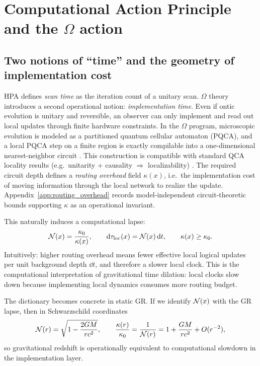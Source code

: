 \section{Computational Action Principle and the \texorpdfstring{$\Omega$}{Omega} action}
\label{sec:cap_action}

\subsection{Two notions of ``time'' and the geometry of implementation cost}
\label{subsec:two_times}

HPA defines \emph{scan time} as the iteration count of a unitary scan. $\Omega$ theory introduces a second operational notion: \emph{implementation time}. Even if ontic evolution is unitary and reversible, an observer can only implement and read out local updates through finite hardware constraints. In the $\Omega$ program, microscopic evolution is modeled as a partitioned quantum cellular automaton (PQCA), and a local PQCA step on a finite region is exactly compilable into a one-dimensional nearest-neighbor circuit \cite{Ma2025FoP}. This construction is compatible with standard QCA locality results (e.g.\ unitarity + causality $\Rightarrow$ localizability) \cite{SchumacherWerner2004,Watrous1995,ArrighiNesmeWerner2011}. The required circuit depth defines a \emph{routing overhead} field $\kappa(x)$, i.e.\ the implementation cost of moving information through the local network to realize the update. Appendix~\ref{app:routing_overhead} records model-independent circuit-theoretic bounds supporting $\kappa$ as an operational invariant.

This naturally induces a computational lapse:
\begin{equation}
  \mathcal{N}(x) = \frac{\kappa_0}{\kappa(x)},
  \qquad
  \mathrm{d}\tau_{\mathrm{loc}}(x) = \mathcal{N}(x)\, \mathrm{d} t,
  \qquad
  \kappa(x)\ge \kappa_0 .
\end{equation}
Intuitively: higher routing overhead means fewer effective local logical updates per unit background depth $\dd t$, and therefore a slower local clock. This is the computational interpretation of gravitational time dilation: local clocks slow down because implementing local dynamics consumes more routing budget.

The dictionary becomes concrete in static GR. If we identify $\mathcal{N}(x)$ with the GR lapse, then in Schwarzschild coordinates \cite{Wald1984,MisnerThorneWheeler1973}
\begin{equation}
  \mathcal{N}(r)=\sqrt{1-\frac{2GM}{rc^{2}}},
  \qquad
  \frac{\kappa(r)}{\kappa_0} = \frac{1}{\mathcal{N}(r)}
  =1+\frac{GM}{rc^{2}}+O(r^{-2}),
\end{equation}
so gravitational redshift is operationally equivalent to computational slowdown in the implementation layer.

